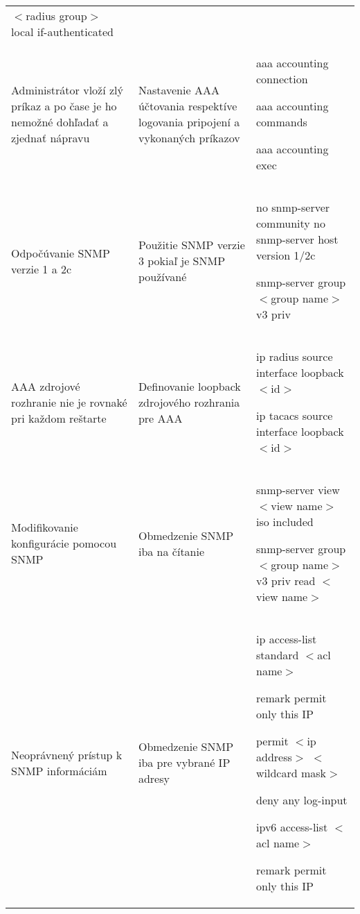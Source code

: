 \begin{longtable}[!htbp]{|L{10em}L{10em}>{\selectfont}L{34em}|}
	\hspace{0.5em} $<$radius group$>$ local if-authenticated \\
	
	
	
	
	 Administrátor vloží zlý príkaz a po čase je ho nemožné dohľadať a zjednať nápravu	&Nastavenie AAA účtovania respektíve logovania pripojení a vykonaných príkazov	&aaa accounting connection
	
	aaa accounting commands
	
	aaa accounting exec\\
	
	
	
	
	Odpočúvanie SNMP verzie 1 a 2c	&Použitie SNMP verzie 3 pokiaľ je SNMP používané	&no snmp-server community
	no snmp-server host  version 1/2c
	
	snmp-server group $<$group name$>$ v3 priv \\
	
	
	
	
	 AAA zdrojové rozhranie nie je rovnaké pri každom reštarte	&Definovanie loopback zdrojového rozhrania pre AAA	&ip radius source interface loopback $<$id$>$
	
	ip tacacs source interface loopback $<$id$>$\\
	
	
	
	
	Modifikovanie konfigurácie pomocou SNMP	&Obmedzenie SNMP iba na čítanie	&snmp-server view $<$view name$>$ iso included
	
	snmp-server group $<$group name$>$ v3 priv read $<$view name$>$\\
	
	
	
	
	 Neoprávnený prístup k SNMP informáciám	&Obmedzenie SNMP iba pre vybrané IP adresy	&ip access-list standard $<$acl name$>$
	
	\hspace{0.5em}remark permit only this IP 
	
	\hspace{0.5em}permit $<$ip address$>$ $<$wildcard mask$>$
	
	\hspace{0.5em}deny any log-input
	\vspace{0.5em}
	
	ipv6 access-list $<$acl name$>$
	
	\hspace{0.5em}remark permit only this IP 
	

\end{longtable}
